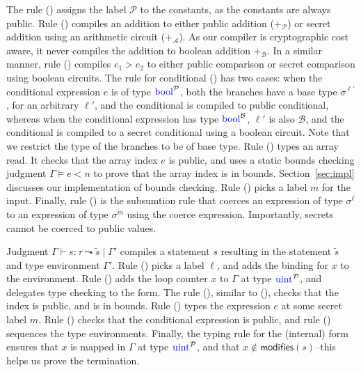 The rule ({}) assigns the label $\mathcal{P}$ to the
constants, as the constants are always public. Rule ({})
compiles an addition to either public addition ($+_{\mathcal{P}}$) or
secret addition using an arithmetic circuit ($+_{\mathcal{A}}$). As
our compiler is cryptographic cost aware, it never compiles the
addition to boolean addition $+_{\mathcal{B}}$. In a similar manner,
rule ({}) compiles $e_{1} > e_{2}$ to either public comparison
or secret comparison using boolean circuits. The rule for conditional
({}) has two cases: when the conditional expression $e$ is of
type $\kw{bool}^{\mathcal{P}}$, both the branches have a base type
$\sigma^{\ell'}$, for an arbitrary $\ell'$, and the conditional is
compiled to public conditional, whereas when the conditional
expression has type $\kw{bool}^{\mathcal{B}}$, $\ell'$ is also
$\mathcal{B}$, and the conditional is compiled to a secret conditional
using a boolean circuit. Note that we restrict the type of the branches
to be of base type. Rule ({}) types an array read. It checks
that the array index $e$ is public, and uses a static bounds checking
judgment $\Gamma \models e < n$ to prove that the array index is in
bounds. Section~\ref{sec:impl} discusses our implementation of bounds
checking. Rule ({}) picks a label $m$ for the input. Finally,
rule ({}) is the subsumtion rule that coerces an expression of
type $\sigma^{\ell}$ to an expression of type $\sigma^{m}$ using the
coerce expression. Importantly, secrets cannot be coerced to public
values.

Judgment $\Gamma \vdash s : \tau \leadsto \widetilde{s} \mid \Gamma'$
compiles a statement $s$ resulting in the statement $\widetilde{s}$
and type environment $\Gamma'$. Rule ({}) picks a label
$\ell$, and adds the binding for $x$ to the environment. Rule
({}) adds the loop counter $x$ to $\Gamma$ at type
$\kw{uint}^{\mathcal{P}}$, and delegates type checking to the
 form. The rule ({}), similar to ({}),
checks that the index is public, and is in bounds. Rule ({})
types the expression $e$ at some secret label $m$. Rule ({})
checks that the conditional expression is public, and rule
({}) sequences the type environments. Finally, the typing
rule for the (internal)  form ensures that $x$ is mapped in
$\Gamma$ at type $\kw{uint}^{\mathcal{P}}$, and that $x \notin
\mathsf{modifies}(s)$--this helps us prove the termination.

